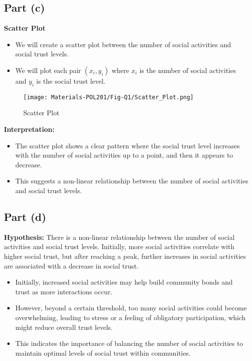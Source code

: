 \documentclass{article}
\begin{document}
\subsection*{Part (c)}

\textbf{Scatter Plot}

\begin{itemize}
    \item We will create a scatter plot between the number of social activities and social trust levels.
    \item We will plot each pair $(x_i, y_i)$ where $x_i$ is the number of social activities and $y_i$ is the social trust level.
\end{itemize}

\begin{figure}[H]
    \centering
    \texttt{[image: Materials-POL201/Fig-Q1/Scatter\_Plot.png]}
    \caption{Scatter Plot}
    \label{fig:fig1}
\end{figure}

\textbf{Interpretation:}
\begin{itemize}
    \item The scatter plot shows a clear pattern where the social trust level increases with the number of social activities up to a point, and then it appears to decrease.
    \item This suggests a non-linear relationship between the number of social activities and social trust levels.
\end{itemize}

\subsection*{Part (d)}


\textbf{Hypothesis:} There is a non-linear relationship between the number of social activities and social trust levels. Initially, more social activities correlate with higher social trust, but after reaching a peak, further increases in social activities are associated with a decrease in social trust. 
\begin{itemize}
    \item Initially, increased social activities may help build community bonds and trust as more interactions occur.
    \item However, beyond a certain threshold, too many social activities could become overwhelming, leading to stress or a feeling of obligatory participation, which might reduce overall trust levels.
    \item This indicates the importance of balancing the number of social activities to maintain optimal levels of social trust within communities.
\end{itemize}
\end{document}
